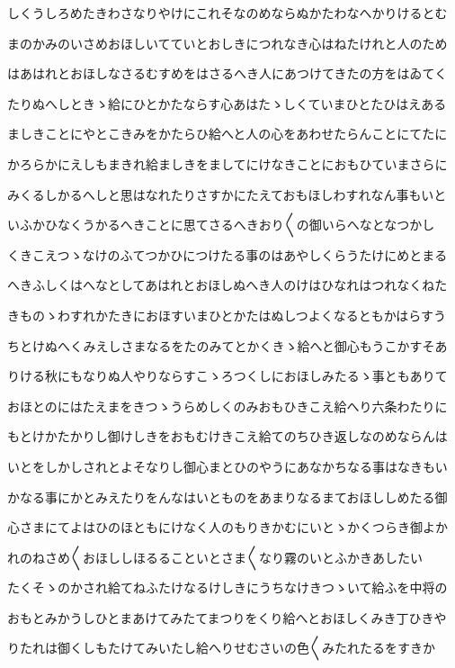 \documentclass[a4paper,11pt,landscape]{ltjtarticle}
\begin{document}
しくうしろめたきわさなりやけにこれそなのめならぬかたわなへかりけるとむ
\par\medskip
まのかみのいさめおほしいてていとおしきにつれなき心はねたけれと人のため
\par\medskip
はあはれとおほしなさるむすめをはさるへき人にあつけてきたの方をはゐてく
\par\medskip
たりぬへしときゝ給にひとかたならす心あはたゝしくていまひとたひはえある
\par\medskip
ましきことにやとこきみをかたらひ給へと人の心をあわせたらんことにてたに
\par\medskip
かろらかにえしもまきれ給ましきをましてにけなきことにおもひていまさらに
\par\medskip
みくるしかるへしと思はなれたりさすかにたえておもほしわすれなん事もいと
\par\medskip
いふかひなくうかるへきことに思てさるへきおり〱の御いらへなとなつかし
\par\medskip
くきこえつゝなけのふてつかひにつけたる事のはあやしくらうたけにめとまる
\par\medskip
へきふしくはへなとしてあはれとおほしぬへき人のけはひなれはつれなくねた
\par\medskip
きものゝわすれかたきにおほすいまひとかたはぬしつよくなるともかはらすう
\par\medskip
ちとけぬへくみえしさまなるをたのみてとかくきゝ給へと御心もうこかすそあ
\par\medskip
りける秋にもなりぬ人やりならすこゝろつくしにおほしみたるゝ事ともありて
\par\medskip
おほとのにはたえまをきつゝうらめしくのみおもひきこえ給へり六条わたりに
\par\medskip
もとけかたかりし御けしきをおもむけきこえ給てのちひき返しなのめならんは
\par\medskip
いとをしかしされとよそなりし御心まとひのやうにあなかちなる事はなきもい
\par\medskip
かなる事にかとみえたりをんなはいとものをあまりなるまておほししめたる御
\par\medskip
心さまにてよはひのほともにけなく人のもりきかむにいとゝかくつらき御よか
\par\medskip
れのねさめ〱おほししほるることいとさま〱なり霧のいとふかきあしたい
\par\medskip
たくそゝのかされ給てねふたけなるけしきにうちなけきつゝいて給ふを中将の
\par\medskip
おもとみかうしひとまあけてみたてまつりをくり給へとおほしくみき丁ひきや
\par\medskip
りたれは御くしもたけてみいたし給へりせむさいの色〱みたれたるをすきか
\end{document}
